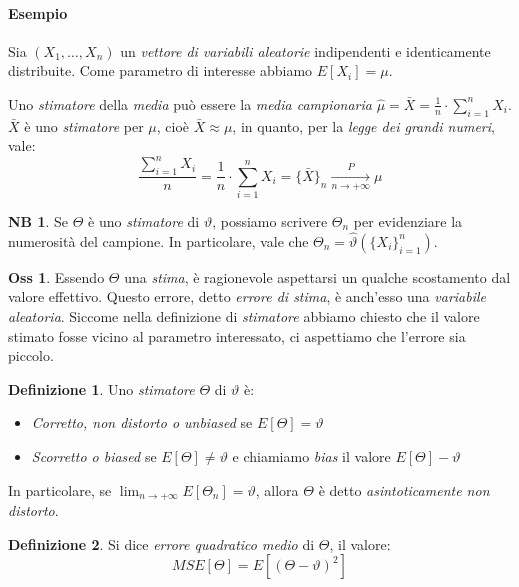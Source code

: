 \documentclass[12pt, a4paper]{report}
\theoremstyle{definition}
\newtheorem{definition}{Definizione}[section]
\newtheorem*{observation}{Oss}
\newtheorem*{note}{NB}
\newcommand\conv[2]{\xrightarrow[#2\to +\infty]{#1}}
\begin{document}
\paragraph{Esempio}
Sia \((X_1,\dots,X_n)\) un \emph{vettore di variabili aleatorie} indipendenti e
identicamente distribuite. Come parametro di interesse abbiamo \(E[X_i]=\mu\).

Uno \emph{stimatore} della \emph{media} può essere la \emph{media campionaria}
\(\hat{\mu}=\bar{X}=\frac{1}{n}\cdot \sum_{i=1}^nX_i\). $\bar{X}$ è uno \emph{stimatore}
per $\mu$, cioè $\bar{X}\approx\mu$, in quanto, per la \emph{legge dei grandi
numeri}, vale:
\[\frac{\sum_{i=1}^nX_i}{n}=\frac{1}{n}\cdot \sum_{i=1}^nX_i=\{\bar{X}\}_n\conv{P}{n}\mu\]
\newpage
\begin{note}
	Se $\Theta$ è uno \emph{stimatore} di $\vartheta$, possiamo scrivere $\Theta_n$
	per evidenziare la numerosità del campione. In particolare, vale che \(\Theta_n
	=\hat{\vartheta}(\{X_i\}_{i=1}^n)\).
\end{note}

\begin{observation}
	Essendo $\Theta$ una \emph{stima}, è ragionevole aspettarsi un qualche scostamento
	dal valore effettivo. Questo errore, detto \emph{errore di stima}, è anch'esso
	una \emph{variabile aleatoria}. Siccome nella definizione di \emph{stimatore}
	abbiamo chiesto che il valore stimato fosse vicino al parametro interessato,
	ci aspettiamo che l'errore sia piccolo.
\end{observation}

\begin{definition}
	Uno \emph{stimatore} $\Theta$ di $\vartheta$ è:
	\begin{itemize}
		\item \emph{Corretto, non distorto o unbiased} se $E[\Theta]=\vartheta$
		\item \emph{Scorretto o biased} se $E[\Theta]\neq\vartheta$ e chiamiamo
		\emph{bias} il valore $E[\Theta]-\vartheta$
	\end{itemize}
	In particolare, se \(\lim_{n\to +\infty}E[\Theta_n]=\vartheta\), allora $\Theta$
	è detto \emph{asintoticamente non distorto}.
\end{definition}

\begin{definition}
	Si dice \emph{errore quadratico medio} di $\Theta$, il valore:
	\[MSE[\Theta]=E\left[(\Theta-\vartheta)^2\right]\]  
\end{definition}
\end{document}
